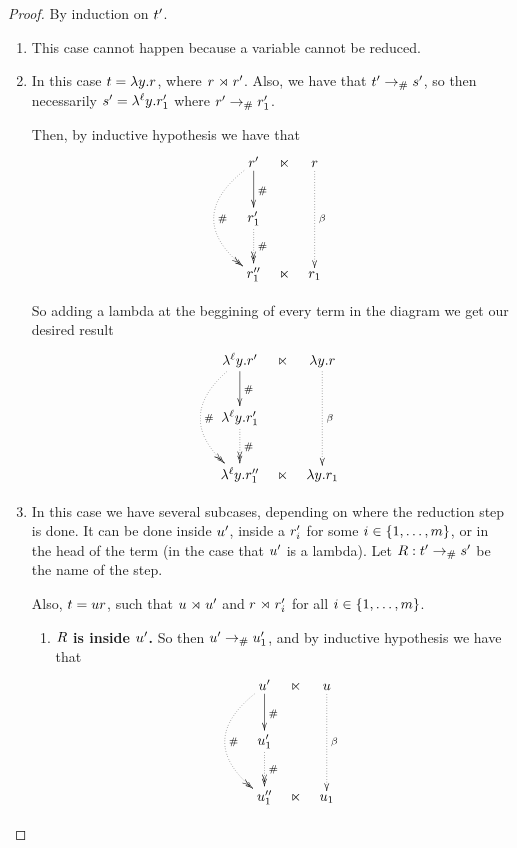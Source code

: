 \begin{proof}
By induction on $t'$.
\begin{enumerate}
\item {} This case cannot happen because a variable cannot be reduced.
\item {}
  In this case $t = \lambda y. r$, where $r \mathrel{\rtimes} r'$.
  Also, we have that $t' \mathrel{\to_{\mathtt{\#}}} s'$,
  so then necessarily $s' = \lambda^{\ell} y. r'_1$
  where $r' \mathrel{\to_{\mathtt{\#}}} r'_1$.

  Then, by inductive hypothesis we have that
  \[
  \xymatrix@C=.25cm{
  \tmfour' \ar[d]^{\dist} \ar@{.>>}@/_1cm/[dd]^{\dist} & \refines  & \tmfour  \ar@{.>}[dd]^{\beta} \\
  \tmfour'_1 \ar@{.>>}[d]^{\dist}                     &            &                             \\
  \tmfour''_1                                         & \refines  & \tmfour_1                      \\
  }
  \]

  So adding a lambda at the beggining of every term in the diagram we get our desired result
  \[
  \xymatrix@C=.25cm{
  \lamp{\lab}{\vartwo}{\tmfour'} \ar[d]^{\dist} \ar@{.>>}@/_1cm/[dd]^{\dist} & \refines  & \lam{\vartwo}{\tmfour}  \ar@{.>}[dd]^{\beta} \\
  \lamp{\lab}{\vartwo}{\tmfour'_1} \ar@{.>>}[d]^{\dist}  &            &    \\
  \lamp{\lab}{\vartwo}{\tmfour''_1} & \refines  & \lam{\vartwo}{\tmfour_1} \\
  }
  \]

\item {}
  In this case we have several subcases, depending on where the reduction step is done.
  It can be done inside $u'$, inside a $r'_i$ for some $i \in \{1, \hdots, m\}$,
  or in the head of the term (in the case that $u'$ is a lambda).
  Let $R : t' \mathrel{\to_{\mathtt{\#}}} s'$ be the name of the step.

  Also, $t = u r$, such that $u \mathrel{\rtimes} u'$
  and $r \mathrel{\rtimes} r'_i$ for all $i \in \{1, \hdots, m\}$.

  \begin{enumerate}
  \item {\bf $R$ is inside $u'$.}
    So then $u' \mathrel{\to_{\mathtt{\#}}} u'_1$, and by inductive hypothesis we have that
  \[
  \xymatrix@C=.25cm{
  \tmthree' \ar[d]^{\dist} \ar@{.>>}@/_1cm/[dd]^{\dist} & \refines & \tmthree  \ar@{.>}[dd]^{\beta} \\
  \tmthree'_1 \ar@{.>>}[d]^{\dist}                     &           &                             \\
  \tmthree''_1                                         & \refines  & \tmthree_1                    \\
  }
  \]


\end{enumerate}
\end{enumerate}
\end{proof}
